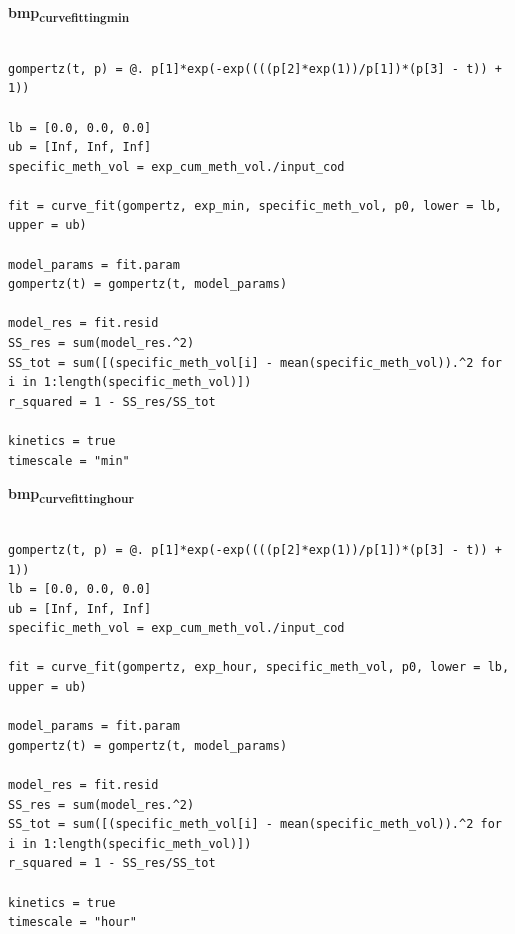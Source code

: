 \documentclass[11pt]{article}
\begin{document}
\textbf{bmp\textsubscript{curve}\textsubscript{fitting}\textsubscript{min}}
\begin{verbatim}

gompertz(t, p) = @. p[1]*exp(-exp((((p[2]*exp(1))/p[1])*(p[3] - t)) + 1))

lb = [0.0, 0.0, 0.0]
ub = [Inf, Inf, Inf]
specific_meth_vol = exp_cum_meth_vol./input_cod

fit = curve_fit(gompertz, exp_min, specific_meth_vol, p0, lower = lb, upper = ub)

model_params = fit.param
gompertz(t) = gompertz(t, model_params)

model_res = fit.resid
SS_res = sum(model_res.^2)
SS_tot = sum([(specific_meth_vol[i] - mean(specific_meth_vol)).^2 for i in 1:length(specific_meth_vol)])
r_squared = 1 - SS_res/SS_tot

kinetics = true
timescale = "min"
\end{verbatim}


\textbf{bmp\textsubscript{curve}\textsubscript{fitting}\textsubscript{hour}}
\begin{verbatim}

gompertz(t, p) = @. p[1]*exp(-exp((((p[2]*exp(1))/p[1])*(p[3] - t)) + 1))
lb = [0.0, 0.0, 0.0]
ub = [Inf, Inf, Inf]
specific_meth_vol = exp_cum_meth_vol./input_cod

fit = curve_fit(gompertz, exp_hour, specific_meth_vol, p0, lower = lb, upper = ub)

model_params = fit.param
gompertz(t) = gompertz(t, model_params)

model_res = fit.resid
SS_res = sum(model_res.^2)
SS_tot = sum([(specific_meth_vol[i] - mean(specific_meth_vol)).^2 for i in 1:length(specific_meth_vol)])
r_squared = 1 - SS_res/SS_tot

kinetics = true
timescale = "hour"
\end{verbatim}
\end{document}
